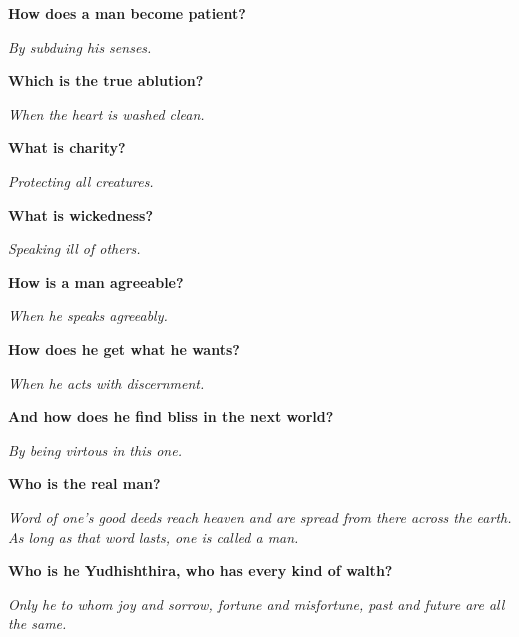 \textbf{How does a man become patient?} 

\textit{By subduing his senses.}\medskip 

\textbf{Which is the true ablution?} 

\textit{When the heart is washed clean.}\medskip 

\textbf{What is charity?} 

\textit{Protecting all creatures.}\medskip 

\textbf{What is wickedness?} 

\textit{Speaking ill of others.}\medskip 

\textbf{How is a man agreeable?} 

\textit{When he speaks agreeably.}\medskip 

\textbf{How does he get what he wants?} 

\textit{When he acts with discernment.}\medskip 

\textbf{And how does he find bliss in the next world?} 

\textit{By being virtous in this one.}\medskip 

\textbf{Who is the real man?} 

\textit{Word of one's good deeds reach heaven and are spread from there across the earth. As long as that word lasts, one is called a man.}\medskip 

\textbf{Who is he Yudhishthira, who has every kind of walth?} 

\textit{Only he to whom joy and sorrow, fortune and misfortune, past and future are all the same.}\medskip 